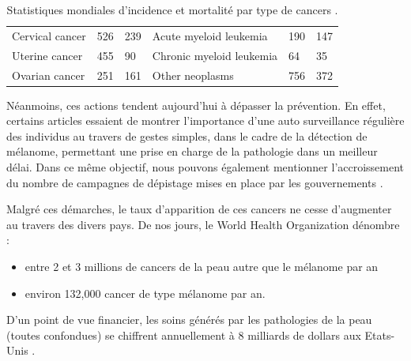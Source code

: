 \begin{table}[H]
\begin{tabular}{lll|lll}
    Cervical cancer                     & 526               & 239           &  Acute myeloid leukemia          & 190                & 147           \\
    Uterine cancer                      & 455               & 90            &  Chronic myeloid leukemia        & 64                 & 35            \\
    Ovarian cancer                      & 251               & 161           &  Other neoplasms                 & 756                & 372           \\
    \end{tabular}    
    \caption{Statistiques mondiales d’incidence et mortalité par type de cancers \cite{Karimkhani2017}.}
    \label{tab:cancer_incidence}
\end{table}\par
Néanmoins, ces actions tendent aujourd’hui à dépasser la prévention. En effet, certains articles essaient de montrer l’importance d’une auto surveillance régulière des individus au travers de gestes simples, dans le cadre de la détection de mélanome, permettant une prise en charge de la pathologie dans un meilleur délai.  Dans ce même objectif, nous pouvons également mentionner l’accroissement  du nombre de campagnes de dépistage mises en place par les gouvernements \cite{Friedman1985}.\par
Malgré ces démarches, le taux d’apparition de ces cancers ne cesse d’augmenter au travers des divers pays. De nos jours, le World Health Organization dénombre :
\begin{itemize}
\item entre 2 et 3 millions de cancers de la peau autre que le mélanome par an
\item environ 132,000 cancer de type mélanome par an.
\end{itemize}\par
D'un point de vue financier, les soins générés par les pathologies de la peau (toutes confondues) se chiffrent annuellement à 8 milliards de dollars aux Etats-Unis \cite{Farberg2017a}.\par

